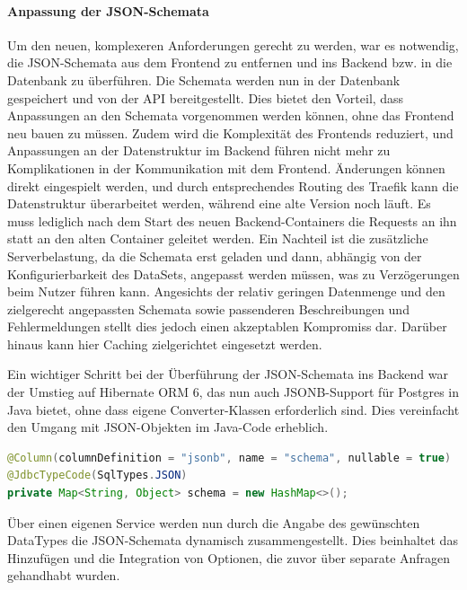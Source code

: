 \paragraph{Anpassung der JSON-Schemata}
Um den neuen, komplexeren Anforderungen gerecht zu werden, war es notwendig, die JSON-Schemata aus dem Frontend zu entfernen und ins Backend bzw. in die Datenbank zu überführen. Die Schemata werden nun in der 
Datenbank gespeichert und von der API bereitgestellt. Dies bietet den Vorteil, dass Anpassungen an den Schemata vorgenommen werden können, ohne das Frontend neu bauen zu müssen. Zudem wird die Komplexität des Frontends reduziert, und Anpassungen an der Datenstruktur im Backend führen nicht mehr zu Komplikationen in der Kommunikation mit dem Frontend. Änderungen können direkt eingespielt werden, und durch entsprechendes Routing des Traefik kann die Datenstruktur überarbeitet werden, während eine alte Version noch läuft. Es muss lediglich nach dem Start des neuen Backend-Containers die Requests an ihn statt an den alten Container geleitet werden. Ein Nachteil ist die zusätzliche Serverbelastung, da die Schemata erst geladen und dann, abhängig von der Konfigurierbarkeit des DataSets, angepasst werden müssen, was zu Verzögerungen beim Nutzer führen kann. Angesichts der relativ geringen Datenmenge und den zielgerecht angepassten Schemata sowie passenderen Beschreibungen und Fehlermeldungen stellt dies jedoch einen akzeptablen Kompromiss dar. Darüber hinaus kann hier Caching zielgerichtet eingesetzt werden.

Ein wichtiger Schritt bei der Überführung der JSON-Schemata ins Backend war der Umstieg auf Hibernate ORM 6, das nun auch JSONB-Support für Postgres in Java bietet, ohne dass eigene Converter-Klassen erforderlich sind. 
Dies vereinfacht den Umgang mit JSON-Objekten im Java-Code erheblich.

\begin{lstlisting}[language=Java, caption=Neuer Umgang mit JSONB-Elementen in Java]
@Column(columnDefinition = "jsonb", name = "schema", nullable = true)
@JdbcTypeCode(SqlTypes.JSON)
private Map<String, Object> schema = new HashMap<>();
\end{lstlisting}

Über einen eigenen Service werden nun durch die Angabe des gewünschten DataTypes die JSON-Schemata dynamisch zusammengestellt. Dies beinhaltet das Hinzufügen und die Integration von Optionen, die zuvor über separate Anfragen gehandhabt wurden.

